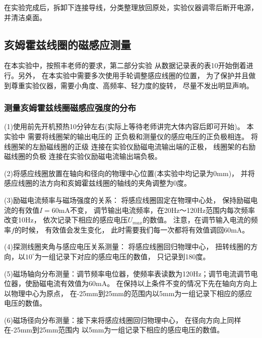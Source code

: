 \documentclass[11pt]{article}
\begin{document}
在实验完成后，拆卸下连接导线，分类整理放回原处，实验仪器调零后断开电源，并清洁桌面。

	







\subsection{亥姆霍兹线圈的磁感应测量}
\begin{kaishu}
	在本实验中，按照丰老师的要求，第二部分实验
	从数据记录表的表10开始倒着进行。另外，
	在本实验中需要多次使用手轮调整感应线圈的位置，
	为了保护并且做到尊重实验仪器，需要小角度、高频率、轻力度的旋转，
	尽量不发出明显声响。
\end{kaishu}
	
\subsubsection{测量亥姆霍兹线圈磁感应强度的分布}

	(1)使用前先开机预热10分钟左右(实际上等待老师讲完大体内容后即可开始)。
	本实验中
	需要将线圈架的输出电压的
	正负极和测量仪的感应电压的正负极相连。
	将线圈架的左励磁线圈的正级
	连接在实验仪励磁电流输出端的正极，
	线圈架的右励磁线圈的负极
	连接在实验仪励磁电流输出端负极。
	
	(2)将感应线圈放置在轴向和径向的物理中心位置(本实验中均记录为0mm)，
	并将感应线圈的法方向和亥姆霍兹线圈的轴线的夹角调整为0度。

(3)励磁电流频率与磁场强度的关系：
	将感应线圈固定在物理中心处，
	保持励磁电流的有效值$I=60$mA不变，
	调节输出电流频率，在20Hz～120Hz范围内每次频率改变10Hz，
	依次记录下相应的感应电压$U_{max}$的数值。
	注意，在调节输入电流的频率$f$的时候，
	有效值会发生变化，
	此时需要我们每一次都将有效值调回60mA。

	(4)探测线圈夹角与感应电压关系测量：
	将感应线圈回归物理中心，
	扭转线圈的方向，以$10^{\circ}$为一组记录下对应的感应电压的数值，
	只记录到180度。
		
	(5)磁场轴向分布测量：调节频率电位器，使频率表读数为120Hz；调节电流调节电位器，使励磁电流有效值为60mA。
	在保持以上条件不变的情况下先在轴向方向上以物理中心为原点，
	在-25mm到25mm的范围内以5mm为一组记录下相应的感应电压的数值。

	(6)磁场径向分布测量：接下来将感应线圈回归物理中心，
	在径向方向上同样在-25mm到25mm范围内
	以5mm为一组记录下相应的感应电压的数值。

	
\end{document}
